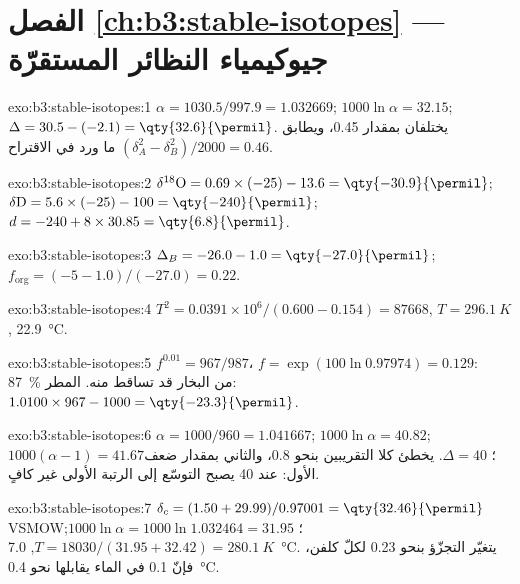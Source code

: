 \section*{الفصل \ref{ch:b3:stable-isotopes} --- جيوكيمياء النظائر المستقرّة}

\begin{solution}{exo:b3:stable-isotopes:1}
$\alpha = 1030.5/997.9 = 1.032669$; $1000\ln\alpha = 32.15$; $\Delta = 30.5 -
(-2.1) = \qty{32.6}{\permil}$. يختلفان بمقدار \qty{0.45}{\permil}، ويطابق
$(\delta_A^2 - \delta_B^2)/2000 = 0.46$ ما ورد في الاقتراح.
\end{solution}

\begin{solution}{exo:b3:stable-isotopes:2}
$\delta^{18}\mathrm O = 0.69\times(-25) - 13.6 = \qty{-30.9}{\permil}$;
$\delta\mathrm D = 5.6\times(-25) - 100 = \qty{-240}{\permil}$; $d = -240 +
8\times30.85 = \qty{6.8}{\permil}$.
\end{solution}

\begin{solution}{exo:b3:stable-isotopes:3}
$\Delta_B = -26.0 - 1.0 = \qty{-27.0}{\permil}$; $f_{\mathrm{org}} = (-5 -
1.0)/(-27.0) = 0.22$.
\end{solution}

\begin{solution}{exo:b3:stable-isotopes:4}
$T^2 = 0.0391\times10^6/(0.600 - 0.154) = \num{87668}$, $T = \qty{296.1}{K}$,
\qty{22.9}{\celsius}.
\end{solution}

\begin{solution}{exo:b3:stable-isotopes:5}
$f^{0.01} = 967/987$، $f = \exp(100\ln0.97974) = 0.129$: \qty{87}{\percent} من
البخار قد تساقط منه. المطر: $1.0100\times967 - 1000 =
\qty{-23.3}{\permil}$.
\end{solution}

\begin{solution}{exo:b3:stable-isotopes:6}
$\alpha = 1000/960 = 1.041667$; $1000\ln\alpha = 40.82$; $1000(\alpha - 1) =
41.67$؛ $\Delta = 40$. يخطئ كلا التقريبين بنحو \qty{0.8}{\permil}،
والثاني بمقدار ضعف الأول: عند \qty{40}{\permil} يصبح التوسّع إلى
الرتبة الأولى غير كافٍ.
\end{solution}

\begin{solution}{exo:b3:stable-isotopes:7}
$\delta_c = (1.50 + 29.99)/0.97001 = \qty{32.46}{\permil}$ VSMOW؛ $1000\ln\alpha
= 1000\ln1.032464 = 31.95$; $T = 18030/(31.95 + 32.42) = \qty{280.1}{K}$,
\qty{7.0}{\celsius}. يتغيّر التجزّؤ بنحو \qty{0.23}{\permil} لكلّ
كلفن، فإنّ \qty{0.1}{\permil} في الماء يقابلها نحو \qty{0.4}{\celsius}.
\end{solution}

